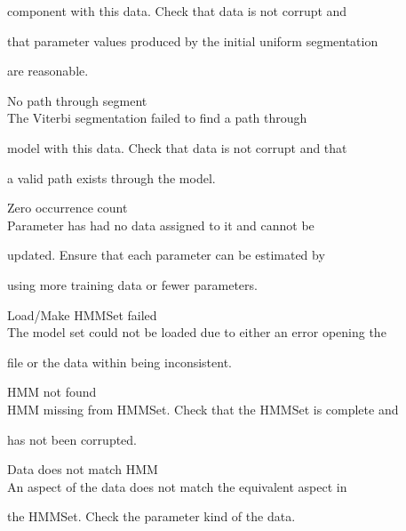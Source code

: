 \begin{itemize}
\begin{itemize}
        component with this data.  Check that data is not corrupt and


        that parameter values produced by the initial uniform segmentation


        are reasonable.





    No path through segment\\


        The Viterbi segmentation failed to find a path through


        model with this data.  Check that data is not corrupt and that


        a valid path exists through the model.





    Zero occurrence count\\


        Parameter has had no data assigned to it and cannot be


        updated.  Ensure that each parameter can be estimated by


        using more training data or fewer parameters.





    Load/Make HMMSet failed\\


        The model set could not be loaded due to either an error opening the


        file or the data within being inconsistent.





    HMM not found\\


        HMM missing from HMMSet.  Check that the HMMSet is complete and 


        has not been corrupted.





    Data does not match HMM\\


        An aspect of the data does not match the equivalent aspect in 


        the HMMSet.  Check the parameter kind of the data.






\end{itemize}
\end{itemize}
